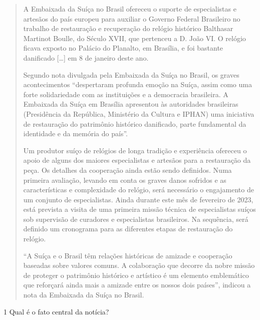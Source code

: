 \begin{quote}
A Embaixada da Suíça no Brasil ofereceu o suporte de especialistas e
artesãos do país europeu para auxiliar o Governo Federal Brasileiro no
trabalho de restauração e recuperação do relógio histórico Balthasar
Martinot Boulle, do Século XVII, que pertenceu a D. João VI. O relógio
ficava exposto no Palácio do Planalto, em Brasília, e foi bastante
danificado {[}\ldots{}{]} em 8 de janeiro deste ano.

Segundo nota divulgada pela Embaixada da Suíça no Brasil, os graves
acontecimentos ``despertaram profunda emoção na Suíça, assim como uma
forte solidariedade com as instituições e a democracia brasileira. A
Embaixada da Suíça em Brasília apresentou às autoridades brasileiras
(Presidência da República, Ministério da Cultura e IPHAN) uma iniciativa
de restauração do patrimônio histórico danificado, parte fundamental da
identidade e da memória do país''.

Um produtor suíço de relógios de longa tradição e experiência ofereceu o
apoio de alguns dos maiores especialistas e artesãos para a restauração
da peça. Os detalhes da cooperação ainda estão sendo definidos. Numa
primeira avaliação, levando em conta os graves danos sofridos e as
características e complexidade do relógio, será necessário o engajamento
de um conjunto de especialistas. Ainda durante este mês de fevereiro de
2023, está prevista a visita de uma primeira missão técnica de
especialistas suíços sob supervisão de curadores e especialistas
brasileiros. Na sequência, será definido um cronograma para as
diferentes etapas de restauração do relógio.

``A Suíça e o Brasil têm relações históricas de amizade e cooperação
baseadas sobre valores comuns. A colaboração que decorre da nobre missão
de proteger o patrimônio histórico e artístico é um elemento emblemático
que reforçará ainda mais a amizade entre os nossos dois países'',
indicou a nota da Embaixada da Suíça no Brasil.

\end{quote}

\num{1} Qual é o fato central da notícia?



